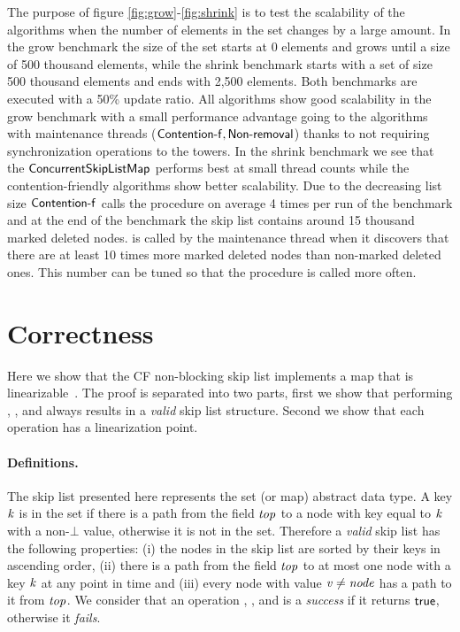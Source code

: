 The purpose of figure \ref{fig:grow}-\ref{fig:shrink} is to test the scalability of the algorithms when the number of elements in the set changes by a large amount.
In the grow benchmark the size of the set starts at 0 elements and grows until a size of 500 thousand elements, while the shrink benchmark starts with
a set of size 500 thousand elements and ends with 2,500 elements.
Both benchmarks are executed with a 50\% update ratio.
All algorithms show good scalability in the grow benchmark with a small performance advantage going to the algorithms with maintenance threads ($\lit{Contention-f,Non-removal}$)
thanks to not requiring synchronization operations to the towers.
In the shrink benchmark we see that the $\lit{ConcurrentSkipListMap}$ performs best at small thread counts while the contention-friendly algorithms show better scalability.
Due to the decreasing list size $\lit{Contention-f}$ calls the  procedure on average 4 times per run of the benchmark and at the end of the
benchmark the skip list contains around 15 thousand marked deleted nodes.
 is called by the maintenance thread when it discovers that there are at least 10 times more marked deleted nodes than non-marked deleted ones.
This number can be tuned so that the procedure is called more often.



\section{Correctness}\label{app:proof}

Here we show that the CF non-blocking skip list implements a map
that is linearizable~\cite{HW90}.
The proof is separated into two parts, first we show that performing
, , and  always results in a \emph{valid} skip list structure.
Second we show that each operation has a linearization point.

\paragraph{Definitions.} 
The skip list presented here represents the set (or map) abstract data type.
A key $\ms{k}$ is in the set if there is a path from the field $\ms{top}$ to a node with 
key equal to $\ms{k}$ with a non-$\bot$ value,
otherwise it is not in the set.
Therefore a \emph{valid} skip list has the following properties:
(i) the nodes in the skip list are sorted by their keys in ascending order,
(ii) there is a path from the field $\ms{top}$ to at most one node with a key $\ms{k}$ at any point in time 
and
(iii) every node with value $\ms{v \neq node}$ has a path to it from $\ms{top}$.
We consider that an operation , , and  is a \emph{success} if it returns $\lit{true}$, otherwise it \emph{fails}.

